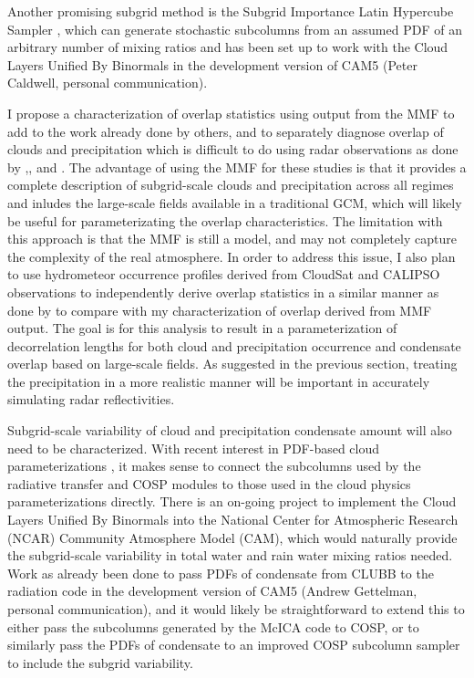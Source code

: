 \documentclass[letter]{article}
\begin{document}
Another promising subgrid method is the Subgrid Importance Latin Hypercube Sampler \citep[SILHS;][]{larson_et_al_2005,larson_and_schanen_2013}, which can generate stochastic subcolumns from an assumed PDF of an arbitrary number of mixing ratios and has been set up to work with the Cloud Layers Unified By Binormals \citep[CLUBB;][]{golaz_et_al_2002} in the development version of CAM5 (Peter Caldwell, personal communication).

I propose a characterization of overlap statistics using output from the MMF to add to the work already done by others, and to separately diagnose overlap of clouds and precipitation which is difficult to do using radar observations as done by \cite{hogan_and_illingworth_2000},\cite{mace_and_benson-troth_2002}, and \cite{barker_2008}. The advantage of using the MMF for these studies is that it provides a complete description of subgrid-scale clouds and precipitation across all regimes and inludes the large-scale fields available in a traditional GCM, which will likely be useful for parameterizating the overlap characteristics. The limitation with this approach is that the MMF is still a model, and may not completely capture the complexity of the real atmosphere. In order to address this issue, I also plan to use hydrometeor occurrence profiles derived from CloudSat \citep{stephens_et_al_2002} and CALIPSO \citep{winker_et_al_2007} observations to independently derive overlap statistics in a similar manner as done by \cite{barker_2008} to compare with my characterization of overlap derived from MMF output. The goal is for this analysis to result in a parameterization of decorrelation lengths for both cloud and precipitation occurrence and condensate overlap based on large-scale fields. As suggested in the previous section, treating the precipitation in a more realistic manner will be important in accurately simulating radar reflectivities.

Subgrid-scale variability of cloud and precipitation condensate amount will also need to be characterized. With recent interest in PDF-based cloud parameterizations \citep[e.g.][]{tompkins_2002}, it makes sense to connect the subcolumns used by the radiative transfer and COSP modules to those used in the cloud physics parameterizations directly. There is an on-going project to implement the Cloud Layers Unified By Binormals \citep[CLUBB][]{golaz_et_al_2002} into the National Center for Atmospheric Research (NCAR) Community Atmosphere Model (CAM), which would naturally provide the subgrid-scale variability in total water and rain water mixing ratios needed. Work as already been done to pass PDFs of condensate from CLUBB to the radiation code in the development version of CAM5 (Andrew Gettelman, personal communication), and it would likely be straightforward to extend this to either pass the subcolumns generated by the McICA code to COSP, or to similarly pass the PDFs of condensate to an improved COSP subcolumn sampler to include the subgrid variability.
\end{document}
